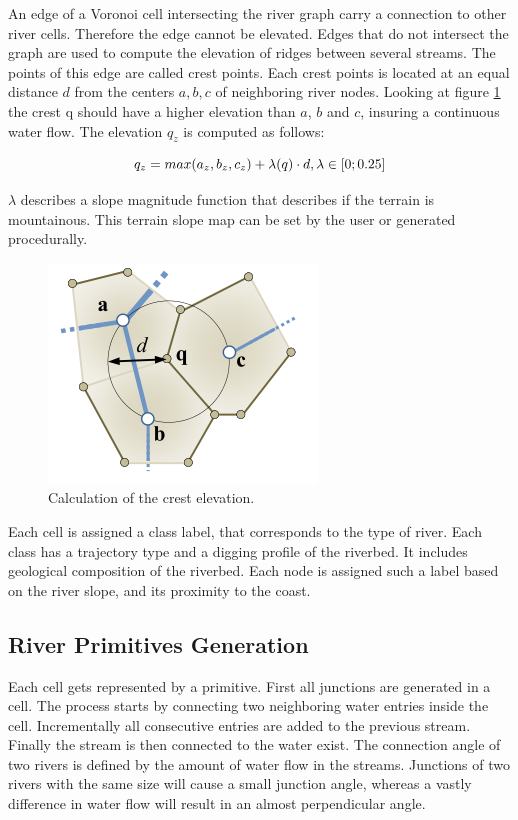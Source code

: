 An edge of a Voronoi cell intersecting the river graph carry a connection to other river cells. Therefore the edge cannot be elevated. Edges that do not intersect the graph are used to compute the elevation of ridges between several streams. The points of this edge are called crest points. Each crest points is located at an equal distance $d$ from the centers $a, b, c$ of neighboring river nodes. Looking at figure \ref{fig:crest} the crest q should have a higher elevation than $a$, $b$ and $c$, insuring a continuous water flow. The elevation $q_z$ is computed as follows: 

$$q_z = max(a_z, b_z, c_z) + \lambda(q) \cdot d, \\ \lambda \in [0; 0.25]$$ 

$\lambda$ describes a slope magnitude function that describes if the terrain is mountainous. This terrain slope map can be set by the user or generated procedurally. 
\begin{figure}[htb]
	\centering
	\includegraphics[width=\linewidth]{GGG13/crest}
	\caption{Calculation of the crest elevation.}
	\label{fig:crest}
\end{figure}

Each cell is assigned a class label, that corresponds to the type of river. Each class has a trajectory type and a digging profile of the riverbed. It includes geological composition of the riverbed. Each node is assigned such a label based on the river slope, and its proximity to the coast. 

\subsection{River Primitives Generation}
Each cell gets represented by a primitive. First all junctions are generated in a cell. The process starts by connecting two neighboring water entries inside the cell. Incrementally all consecutive entries are added to the previous stream. Finally the stream is then connected to the water exist. The connection angle of two rivers is defined by the amount of water flow in the streams. Junctions of two rivers with the same size will cause a small junction angle, whereas a vastly difference in water flow will result in an almost perpendicular angle. 

